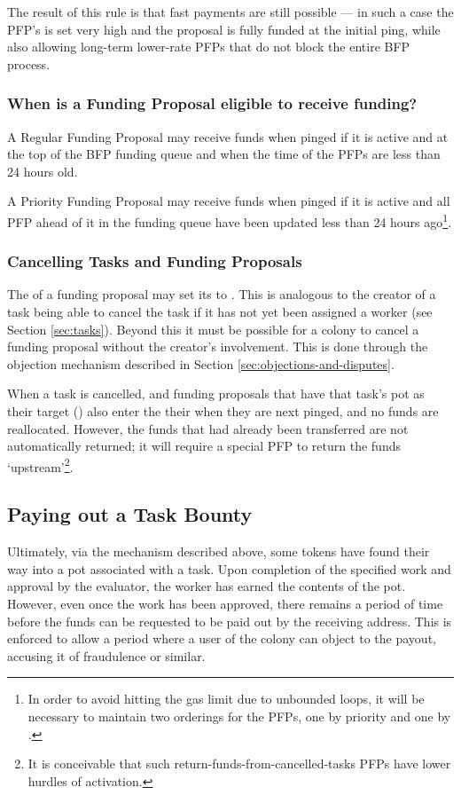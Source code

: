 The result of this rule is that fast payments are still possible --- in such a case the PFP's  is set very high and the proposal is fully funded at the initial ping, while also allowing long-term lower-rate PFPs that do not block the entire BFP process.

\subsubsection*{When is a Funding Proposal eligible to receive funding?}
A Regular Funding Proposal may receive funds when pinged if it is active and at the top of the BFP funding queue and when the  time of the PFPs are less than 24 hours old.

A Priority Funding Proposal may receive funds when pinged if it is active and all PFP ahead of it in the funding queue have been updated less than 24 hours ago\footnote{In order to avoid hitting the gas limit due to unbounded loops, it will be necessary to maintain two orderings for the PFPs, one by priority and one by . }.

\subsubsection{Cancelling Tasks and Funding Proposals}
The  of a funding proposal may set its  to . This is analogous to the creator of a task being able to cancel the task if it has not yet been assigned a worker (see Section \ref{sec:tasks}). Beyond this it must be possible for a colony to cancel a funding proposal without the creator's involvement. This is done through the objection mechanism described in Section \ref{sec:objections-and-disputes}.

When a task is cancelled, and funding proposals that have that task's pot as their target () also enter the  their  when they are next pinged, and no funds are reallocated. However, the funds that had already been transferred are not automatically returned; it will require a special PFP to return the funds `upstream'\footnote{It is conceivable that such return-funds-from-cancelled-tasks PFPs have lower hurdles of activation.}.

\subsection{Paying out a Task Bounty}\label{sec:claiming-bounty}
Ultimately, via the mechanism described above, some tokens have found their way into a pot associated with a task. Upon completion of the specified work and approval by the evaluator, the worker has earned the contents of the pot. However, even once the work has been approved, there remains a period of time before the funds can be requested to be paid out by the receiving address. This is enforced to allow a period where a user of the colony can object to the payout, accusing it of fraudulence or similar.

